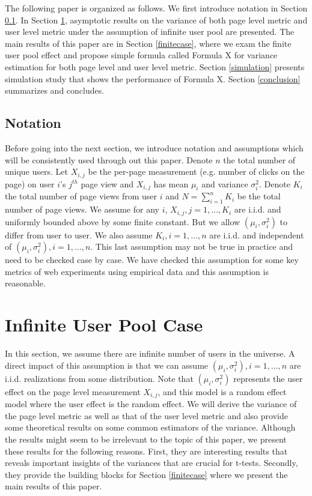 \documentclass[10pt]{article}
\begin{document}
The following paper is organized as follows. We first introduce notation in Section \ref{notation}. In Section \ref{infcase},  asymptotic results on the variance of both page level metric and user level metric under the assumption of infinite user pool are presented. The main results of this paper are in Section \ref{finitecase}, where we exam the finite user pool effect and propose simple formula called Formula X for variance estimation for both page level and user level metric. Section \ref{simulation} presents simulation study that shows the performance of Formula X. Section \ref{conclusion} summarizes and concludes. 

\subsection{Notation}\label{notation}
Before going into the next section, we introduce notation and assumptions which will be consistently used through out this paper. Denote $n$ the total number of unique users. Let $X_{i,j}$ be the per-page measurement (e.g. number of clicks on the page) on user $i$'s $j^{th}$ page view and $X_{i,j}$ has mean $\mu_i$ and variance $\sigma_i^2$.  Denote $K_i$ the total number of page views from user $i$ and $N = \sum_{i=1}^n K_i$ be the total number of page views. We assume for any $i$, $X_{i,j},j=1,\dots,K_i$ are i.i.d. and uniformly bounded above by some finite constant.  But we allow $(\mu_i,\sigma_i^2)$ to differ from user to user. We also assume $K_i,i=1,\dots,n$ are i.i.d. and independent of $(\mu_i,\sigma_i^2),i=1,\dots,n$. This last assumption may not be true in practice and need to be checked case by case. We have checked this assumption for some key metrics of web experiments using empirical data and this assumption is reasonable. 

\section{Infinite User Pool Case}\label{infcase}
In this section, we assume there are infinite number of users in the universe. A direct impact of this assumption is that we can assume $(\mu_i,\sigma_i^2),i=1,\dots,n$ are i.i.d. realizations from some distribution. Note that $(\mu_i,\sigma_i^2)$ represents the user effect on the page level measurement $X_{i,j}$, and this model is a random effect model where the user effect is the random effect. We will derive the variance of the page level metric as well as that of the user level metric and also provide some theoretical results on some common estimators of the variance. Although the results might seem to be irrelevant to the topic of this paper, we present these results for the following reasons. First, they are interesting results that reveals important insights of the variances that are crucial for t-tests. Secondly, they provide the building blocks for Section \ref{finitecase} where we present the main results of this paper. 
\end{document}
